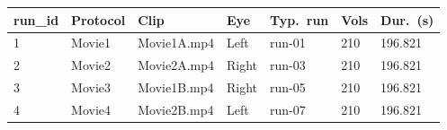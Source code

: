 \documentclass[11pt]{article}
\begin{document}
\pagestyle{empty}
\vspace*{0pt}
\begin{center}
\setlength{\tabcolsep}{5pt}
\renewcommand{\arraystretch}{1.25}
\begin{minipage}{0.96\textwidth}
\centering
\begin{tabularx}{\textwidth}{@{}C{1.6cm} C{2.2cm} Y C{2.2cm} C{2.0cm} C{1.8cm} C{2.0cm}@{}}
\toprule
\textcolor{headergray}{\textbf{run\_id}} &
\textcolor{headergray}{\textbf{Protocol}} &
\textcolor{headergray}{\textbf{Clip}} &
\textcolor{headergray}{\textbf{Eye}} &
\textcolor{headergray}{\textbf{Typ.\ run}} &
\textcolor{headergray}{\textbf{Vols}} &
\textcolor{headergray}{\textbf{Dur.\ (s)}} \\
 & Movie1 & Movie1A.mp4 & Left & {\ttfamily run-01} & 210 & 196.821 \\
 2 & Movie2 & Movie2A.mp4 & Right & {\ttfamily run-03} & 210 & 196.821 \\
3 & Movie3 & Movie1B.mp4 & Right & {\ttfamily run-05} & 210 & 196.821 \\
 4 & Movie4 & Movie2B.mp4 & Left & {\ttfamily run-07} & 210 & 196.821 \\
\bottomrule
\end{tabularx}
\end{minipage}
\end{center}
\end{document}
